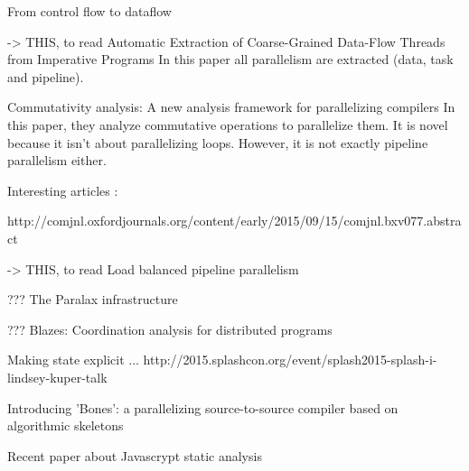 From control flow to dataflow \cite{Beck1991}


-> THIS, to read
Automatic Extraction of Coarse-Grained Data-Flow Threads from Imperative Programs \cite{Li2012}
In this paper all parallelism are extracted (data, task and pipeline).


Commutativity analysis: A new analysis framework for parallelizing compilers \cite{Rinard1996}
In this paper, they analyze commutative operations to parallelize them.
It is novel because it isn't about parallelizing loops.
However, it is not exactly pipeline parallelism either.


Interesting articles :

http://comjnl.oxfordjournals.org/content/early/2015/09/15/comjnl.bxv077.abstract


-> THIS, to read
Load balanced pipeline parallelism \cite{Kamruzzaman2013}


??? The Paralax infrastructure \cite{Vandierendonck2010a}

??? Blazes: Coordination analysis for distributed programs \cite{Alvaro2014}

Making state explicit ... \cite{Fernandez2014a}
http://2015.splashcon.org/event/splash2015-splash-i-lindsey-kuper-talk


Introducing 'Bones': a parallelizing source-to-source compiler based on algorithmic skeletons \cite{Nugteren2012}


Recent paper about Javascrypt static analysis \cite{Chudnov2015}
